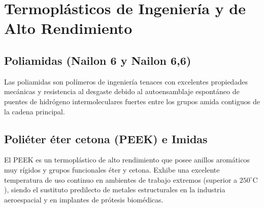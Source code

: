\section{Termoplásticos de Ingeniería y de Alto Rendimiento}

\subsection{Poliamidas (Nailon 6 y Nailon 6,6)}
Las poliamidas son polímeros de ingeniería tenaces con excelentes propiedades mecánicas y resistencia al desgaste debido al autoensamblaje espontáneo de puentes de hidrógeno intermoleculares fuertes entre los grupos amida contiguos de la cadena principal.

\subsection{Poliéter éter cetona (PEEK) e Imidas}
El PEEK es un termoplástico de alto rendimiento que posee anillos aromáticos muy rígidos y grupos funcionales éter y cetona. Exhibe una excelente temperatura de uso continuo en ambientes de trabajo extremos (superior a $250^\circ\text{C}$), siendo el sustituto predilecto de metales estructurales en la industria aeroespacial y en implantes de prótesis biomédicas.
